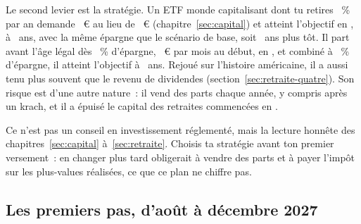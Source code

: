 Le second levier est la strat\'egie. Un ETF monde capitalisant dont tu retires \TauxRetrait~\% par an
demande \KapitalEtfReferenz~€ au lieu de \KapitalMaisonSiebzig~€ (chapitre~\ref{sec:capital}) et
atteint l'objectif en \AnneeEtfBasis, \`a \AlterEtfBasis~ans, avec la m\^eme \'epargne que le
sc\'enario de base, soit \EcartAgeEtfMaisonBasis~ans plus t\^ot. Il part avant l'\^age l\'egal d\`es
\QuoteAnticipeeEtfReferenz~\% d'\'epargne, \EpargneMoisAnticipeeEtfReferenz~€ par mois au d\'ebut, en
\AnneeAnticipeeEtfReferenz, et combin\'e \`a \SparquoteFuenfzig~\% d'\'epargne, il atteint l'objectif \`a
\AlterEtfReferenzFuenfzig~ans. Rejou\'e sur l'histoire am\'ericaine, il a aussi tenu plus souvent que le
revenu de dividendes (section~\ref{sec:retraite-quatre}). Son risque est d'une autre nature~: il vend
des parts chaque ann\'ee, y compris apr\`es un krach, et il a \'epuis\'e le capital des retraites
commenc\'ees en \RetraitHistEchecsListeVierzig.

 Ce n'est pas un conseil en
investissement r\'eglement\'e, mais la lecture honn\^ete des chapitres~\ref{sec:capital}
\`a~\ref{sec:retraite}. Choisis ta strat\'egie avant ton premier versement~: en changer plus tard
obligerait \`a vendre des parts et \`a payer l'imp\^ot sur les plus-values r\'ealis\'ees, ce que ce plan
ne chiffre pas.

\subsection{Les premiers pas, d'ao\^ut \`a d\'ecembre 2027}\label{sec:plan-premiers}


